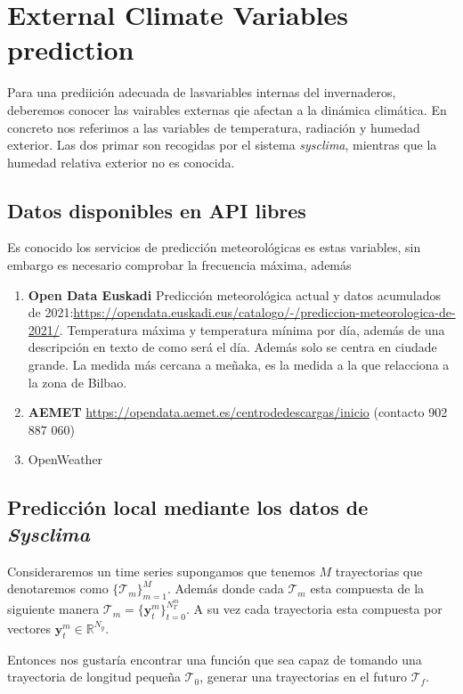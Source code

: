 
    \chapter{External Climate Variables prediction}


Para una prediición adecuada de lasvariables internas del invernaderos, deberemos conocer las vairables externas qie afectan a la dinámica climática. En concreto nos referimos a las variables de temperatura, radiación y humedad exterior. Las dos primar son recogidas por el sistema \emph{sysclima}, mientras que la humedad relativa exterior no es conocida. 

\section{Datos disponibles en API libres}

Es conocido los servicios de predicción meteorológicas es estas variables, sin embargo es necesario comprobar la frecuencia máxima, además

\begin{enumerate}
    \item \textbf{Open Data Euskadi} Predicción meteorológica actual y datos acumulados de 2021:\url{https://opendata.euskadi.eus/catalogo/-/prediccion-meteorologica-de-2021/}. Temperatura máxima y temperatura mínima por día, además de una descripción en texto de como será el día. Además solo se centra en ciudade grande. La medida más cercana a meñaka, es la medida a la que relacciona a la zona de Bilbao.
        
    \item \textbf{AEMET} \url{https://opendata.aemet.es/centrodedescargas/inicio} (contacto 902 887 060)

    \item OpenWeather
\end{enumerate}
\section{Predicción local mediante los datos de \emph{Sysclima}}
    

Consideraremos un time series supongamos que tenemos $M$ trayectorias que denotaremos como $\{\mathcal{T}_m\}_{m=1}^M$. Además donde cada $\mathcal{T}_m$ esta compuesta de la siguiente manera $\mathcal{T}_m = \{\bm{y}^m_t\}_{t=0}^{N_T^m}$. A su vez cada trayectoria esta compuesta por vectores $\bm{y}_t^m \in \mathbb{R}^{N_y}$. 


Entonces nos gustaría encontrar una función que sea capaz de tomando una trayectoria de longitud pequeña $\mathcal{T}_0$, generar una trayectorias en el futuro $\mathcal{T}_f$. 

